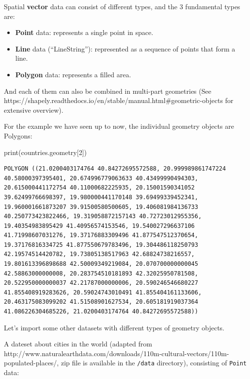 \documentclass[
  letterpaper,
  DIV=11,
  numbers=noendperiod]{scrreprt}
\newenvironment{Shaded}{\begin{snugshade}}{\end{snugshade}}
\newcommand{\BuiltInTok}[1]{\textcolor[rgb]{0.00,0.23,0.31}{#1}}
\newcommand{\DecValTok}[1]{\textcolor[rgb]{0.68,0.00,0.00}{#1}}
\newcommand{\NormalTok}[1]{\textcolor[rgb]{0.00,0.23,0.31}{#1}}
\providecommand{\tightlist}{%
  \setlength{\itemsep}{0pt}\setlength{\parskip}{0pt}}\usepackage{longtable,booktabs,array}
\begin{document}
Spatial \textbf{vector} data can consist of different types, and the 3
fundamental types are:

\begin{itemize}
\tightlist
\item
  \textbf{Point} data: represents a single point in space.
\item
  \textbf{Line} data (``LineString''): represented as a sequence of
  points that form a line.
\item
  \textbf{Polygon} data: represents a filled area.
\end{itemize}

And each of them can also be combined in multi-part geometries (See
https://shapely.readthedocs.io/en/stable/manual.html\#geometric-objects
for extensive overview).

For the example we have seen up to now, the individual geometry objects
are Polygons:

\begin{Shaded}
\begin{Highlighting}[]
\BuiltInTok{print}\NormalTok{(countries.geometry[}\DecValTok{2}\NormalTok{])}
\end{Highlighting}
\end{Shaded}

\begin{verbatim}
POLYGON ((21.0200403174764 40.84272695572588, 20.999989861747224 40.58000397395401, 20.674996779063633 40.43499990494303, 20.615000441172754 40.11000682225935, 20.15001590341052 39.62499766698397, 19.980000441170148 39.69499339452341, 19.960001661873207 39.91500580500605, 19.406081984136733 40.250773423822466, 19.319058872157143 40.72723012955356, 19.40354983895429 41.40956574153546, 19.540027296637106 41.71998607031276, 19.37176883309496 41.877547512370654, 19.37176816334725 41.877550679783496, 19.304486118250793 42.19574514420782, 19.73805138517963 42.68824738216557, 19.801613396898688 42.50009349219084, 20.070700000000045 42.58863000000008, 20.283754510181893 42.32025950781508, 20.522950000000037 42.21787000000006, 20.590246546680227 41.855408919283626, 20.59024743010491 41.855404161133606, 20.463175083099202 41.51508901627534, 20.605181919037364 41.086226304685226, 21.0200403174764 40.84272695572588))
\end{verbatim}

Let's import some other datasets with different types of geometry
objects.

A dateset about cities in the world (adapted from
http://www.naturalearthdata.com/downloads/110m-cultural-vectors/110m-populated-places/,
zip file is available in the \texttt{/data} directory), consisting of
\texttt{Point} data:
\end{document}

